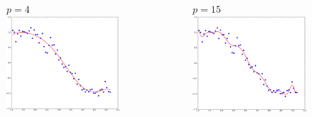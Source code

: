\documentclass[handout]{beamer}
\begin{document}
\begin{frame}
\begin{columns}
\vspace{-2em}
\begin{figure}
$p=4$
\includegraphics[width=0.99\textwidth]{./fig/L1/linreg_pow4.png}
\end{figure}
\vspace{-2em}
\begin{figure}
$p=15$
\includegraphics[width=0.99\textwidth]{./fig/L1/linreg_pow15.png}
\end{figure}
\end{columns}
\end{frame}
\end{document}
